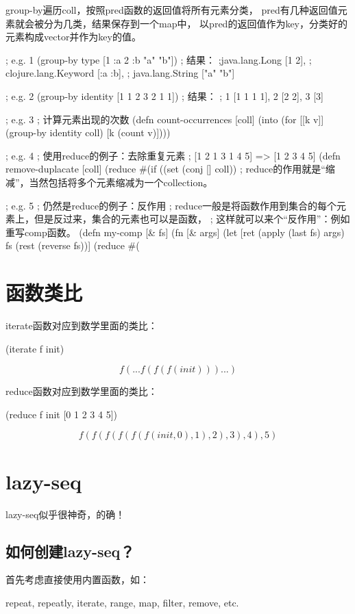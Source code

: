 ﻿\documentclass[a4paper,11pt]{article}
\begin{document}
  group-by遍历coll，按照pred函数的返回值将所有元素分类，
  pred有几种返回值元素就会被分为几类，结果保存到一个map中，
  以pred的返回值作为key，分类好的元素构成vector并作为key的值。

  \begin{schemecode}
; e.g. 1
(group-by type [1 :a 2 :b "a" "b"])
; 结果：
;{java.lang.Long [1 2],
; clojure.lang.Keyword [:a :b],
; java.lang.String ["a" "b"]}

; e.g. 2
(group-by identity [1 1 2 3 2 1 1])
; 结果：
; {1 [1 1 1 1], 2 [2 2], 3 [3]}

; e.g. 3
; 计算元素出现的次数
(defn count-occurrences
  [coll]
  (into {}
    (for [[k v]] (group-by identity coll)
      [k (count v)])))

; e.g. 4
; 使用reduce的例子：去除重复元素
; [1 2 1 3 1 4 5] => [1 2 3 4 5]
(defn remove-duplacate
  [coll]
  (reduce #(if ((set %
               (conj %
          [] coll))
; reduce的作用就是“缩减”，当然包括将多个元素缩减为一个collection。

; e.g. 5
; 仍然是reduce的例子：反作用
; reduce一般是将函数作用到集合的每个元素上，但是反过来，集合的元素也可以是函数，
; 这样就可以来个“反作用”：例如重写comp函数。
(defn my-comp
  [& fs]
  (fn [& args]
    (let [ret (apply (last fs) args)
          fs (rest (reverse fs))]
      (reduce #(%
  \end{schemecode}
  

  \section[函数类比]{函数类比}
  iterate函数对应到数学里面的类比：
  
  \begin{schemecode}
(iterate f init)
  \end{schemecode}
  $$f(...f(f(f(init)))...)$$

  reduce函数对应到数学里面的类比：
  
  \begin{schemecode}
(reduce f init [0 1 2 3 4 5])
  \end{schemecode}
  $$f(f(f(f(f(f(init, 0), 1), 2), 3), 4), 5)$$


  \section[lazy-seq]{lazy-seq}
  lazy-seq似乎很神奇，的确！

  \subsection[如何创建lazy-seq？]{如何创建lazy-seq？}
  首先考虑直接使用内置函数，如：\par
  repeat, repeatly, iterate, range, map, filter, remove, etc.
  
\end{document}
